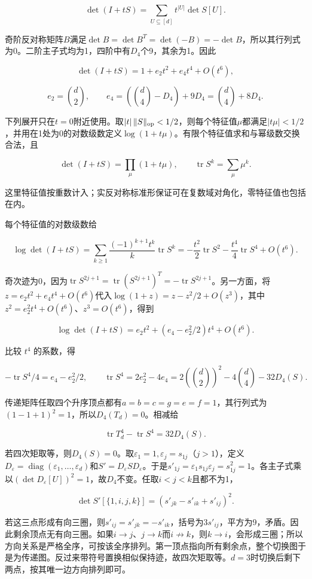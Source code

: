 \documentclass[11pt,a4paper]{article}
\begin{document}
\[
\det(I+tS)=\sum_{U\subseteq[d]}t^{|U|}\det S[U].
\]

奇阶反对称矩阵\(B\)满足\(\det B=\det B^T=\det(-B)=-\det B\)，所以其行列式为0。二阶主子式均为1，四阶中有\(D_4\)个9，其余为1。因此

\[
\det(I+tS)=1+e_2t^2+e_4t^4+O(t^6),
\]

\[
e_2=\binom d2,\qquad
e_4=(\binom d4-D_4)+9D_4=\binom d4+8D_4.
\]

下列展开只在\(t=0\)附近使用。取\(|t|\,\|S\|_{\rm op}<1/2\)，则每个特征值\(\mu\)都满足\(|t\mu|<1/2\)，并用在1处为0的对数级数定义\(\log(1+t\mu)\)。有限个特征值求和与幂级数交换合法，且

\[
\det(I+tS)=\prod_\mu(1+t\mu),\qquad
\operatorname{tr}S^k=\sum_\mu\mu^k.
\]

这里特征值按重数计入；实反对称标准形保证可在复数域对角化，零特征值也包括在内。

每个特征值的对数级数给

\[
\log\det(I+tS)
=\sum_{k\ge1}\frac{(-1)^{k+1}t^k}{k}\operatorname{tr}S^k
=-\frac{t^2}{2}\operatorname{tr}S^2
-\frac{t^4}{4}\operatorname{tr}S^4+O(t^6).
\]

奇次迹为0，因为\(\operatorname{tr}S^{2j+1}=\operatorname{tr}(S^{2j+1})^T=-\operatorname{tr}S^{2j+1}\)。另一方面，将\(z=e_2t^2+e_4t^4+O(t^6)\)代入\(\log(1+z)=z-z^2/2+O(z^3)\)，其中\(z^2=e_2^2t^4+O(t^6)\)、\(z^3=O(t^6)\)，得到

\[
\log\det(I+tS)=e_2t^2+(e_4-e_2^2/2)t^4+O(t^6).
\]

比较 \(t^4\) 的系数，得

\[
-\operatorname{tr}S^4/4=e_4-e_2^2/2,\qquad
\operatorname{tr}S^4=2e_2^2-4e_4
=2\left(\binom d2\right)^2-4\binom d4-32D_4(S).
\]

传递矩阵任取四个升序顶点都有\(a=b=c=g=e=f=1\)，其行列式为\((1-1+1)^2=1\)，所以\(D_4(T_d)=0\)。相减给

\[
\operatorname{tr}T_d^4-\operatorname{tr}S^4=32D_4(S).
\]

若四次矩取等，则\(D_4(S)=0\)。取\(\varepsilon_1=1,\varepsilon_j=s_{1j}\)（\(j>1\)），定义\(D_{\varepsilon}=\operatorname{diag}(\varepsilon_1,\ldots,\varepsilon_d)\)和\(S'=D_{\varepsilon} S D_{\varepsilon}\)。于是\(s'_{1j}=\varepsilon_1s_{1j}\varepsilon_j=s_{1j}^2=1\)。各主子式乘以\((\det D_{\varepsilon}[U])^2=1\)，故\(D_4\)不变。任取\(i<j<k\)且都不为1，

\[
\det S'[\{1,i,j,k\}]
=(s'_{jk}-s'_{ik}+s'_{ij})^2.
\]

若这三点形成有向三圈，则\(s'_{ij}=s'_{jk}=-s'_{ik}\)，括号为\(3s'_{ij}\)，平方为9，矛盾。因此剩余顶点无有向三圈。如果\(i\to j\)、\(j\to k\)而\(i\not\to k\)，则\(k\to i\)，会形成三圈；所以方向关系是严格全序，可按该全序排列。第一顶点指向所有剩余点，整个切换图于是为传递图。反过来带符号置换相似保持迹，故四次矩取等。\(d=3\)时切换后剩下两点，按其唯一边方向排列即可。
\end{document}
